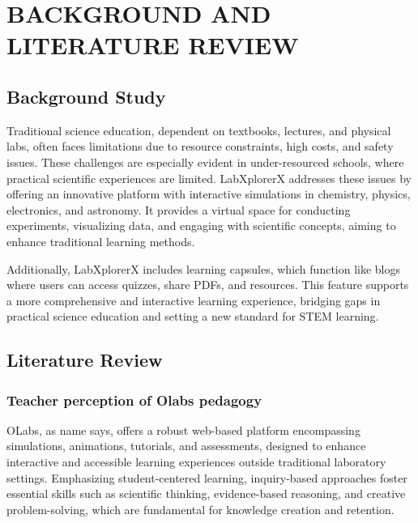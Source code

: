\chapter{BACKGROUND AND LITERATURE REVIEW}





\section{Background Study}

Traditional science education, dependent on textbooks, lectures, and physical labs, often faces limitations due to resource constraints, high costs, and safety issues. These challenges are especially evident in under-resourced schools, where practical scientific experiences are limited.
LabXplorerX addresses these issues by offering an innovative platform with interactive simulations in chemistry, physics, electronics, and astronomy. It provides a virtual space for conducting experiments, visualizing data, and engaging with scientific concepts, aiming to enhance traditional learning methods.

Additionally, LabXplorerX includes learning capsules, which function like blogs where users can access quizzes, share PDFs, and resources. This feature supports a more comprehensive and interactive learning experience, bridging gaps in practical science education and setting a new standard for STEM learning.
\section{Literature Review}
\subsection*{Teacher perception of Olabs pedagogy}
OLabs, as name says, offers a robust web-based platform encompassing simulations, animations, tutorials, and assessments, designed to enhance interactive and accessible learning experiences outside traditional laboratory settings. Emphasizing student-centered learning, inquiry-based approaches foster essential skills such as scientific thinking, evidence-based reasoning, and creative problem-solving, which are fundamental for knowledge creation and retention.\cite{chandrashekhar2020teacher}
